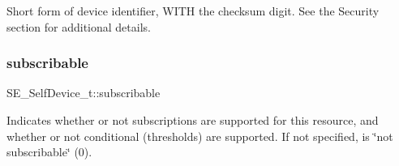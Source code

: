 Short form of device identifier, W\+I\+TH the checksum digit. See the Security section for additional details. \mbox{\label{group__SelfDevice_gaa48517dd0693a35578006ff2ab117c35}} 
\subsubsection{\texorpdfstring{subscribable}{subscribable}}
{\footnotesize\ttfamily S\+E\+\_\+\+Self\+Device\+\_\+t\+::subscribable}

Indicates whether or not subscriptions are supported for this resource, and whether or not conditional (thresholds) are supported. If not specified, is \char`\"{}not subscribable\char`\"{} (0). 